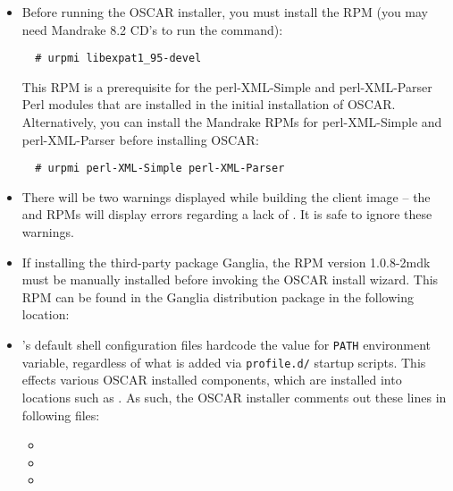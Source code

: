 \begin{itemize}
\item Before running the OSCAR installer, you must install the
   RPM (you may need Mandrake 8.2 CD's to run
  the  command):

\begin{verbatim}
  # urpmi libexpat1_95-devel
\end{verbatim}

  This RPM is a prerequisite for the perl-XML-Simple and
  perl-XML-Parser Perl modules that are installed in the initial
  installation of OSCAR.  Alternatively, you can install the Mandrake
  RPMs for perl-XML-Simple and perl-XML-Parser before installing
  OSCAR:

\begin{verbatim}
  # urpmi perl-XML-Simple perl-XML-Parser
\end{verbatim}

\item There will be two warnings displayed while building the client
  image -- the  and  RPMs will
  display errors regarding a lack of .  It is safe
  to ignore these warnings.
  
\item If installing the third-party package Ganglia, the
   RPM version 1.0.8-2mdk must be manually installed
  before invoking the OSCAR install wizard.  This RPM can be
  found in the Ganglia distribution package in the following location:\\
  
\item {}'s default shell configuration files hardcode the
  value for {\tt PATH} environment variable, regardless of what is
  added via {\tt profile.d/} startup scripts.  This effects various
  OSCAR installed components, which are installed into locations such
  as .  As such, the OSCAR installer comments out these
  lines in following files:

  \begin{itemize}
  \item {}
  \item {}
  \item {}
  \end{itemize}

\end{itemize}

